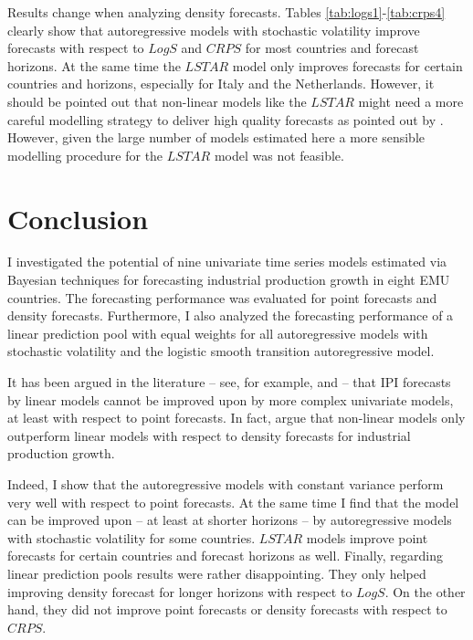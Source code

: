 \documentclass[12pt,letterpaper,fleqn]{article}           %
\begin{document}
Results change when analyzing density forecasts. Tables \ref{tab:logs1}-\ref{tab:crps4} clearly show that autoregressive models with stochastic volatility improve forecasts with respect to $LogS$ and $CRPS$ for most countries and forecast horizons. At the same time the $LSTAR$ model only improves forecasts for certain countries and horizons, especially for Italy and the Netherlands. However, it should be pointed out that non-linear models like the $LSTAR$ might need a more careful modelling strategy to deliver high quality forecasts as pointed out by \textcite{ter05}. However, given the large number of models estimated here a more sensible modelling procedure for the $LSTAR$ model was not feasible.


\section{Conclusion}
\label{sec:conclusion}

I investigated the potential of nine univariate time series models estimated via Bayesian techniques for forecasting industrial production growth in eight EMU countries. The forecasting performance was evaluated for point forecasts and density forecasts. Furthermore, I also analyzed the forecasting performance of a linear prediction pool with equal weights for all autoregressive models with stochastic volatility and the logistic smooth transition autoregressive model. 

It has been argued in the literature -- see, for example, \textcite{marc02} and \textcite{dijk03} -- that IPI forecasts by linear models cannot be improved upon by more complex univariate models, at least with respect to point forecasts. In fact, \textcite{dijk03} argue that non-linear models only outperform linear models with respect to density forecasts for industrial production growth.

Indeed, I show that the autoregressive models with constant variance perform very well with respect to point forecasts. At the same time I find that the model can be improved upon -- at least at shorter horizons -- by autoregressive models with stochastic volatility for some countries. $LSTAR$ models improve point forecasts for certain countries and forecast horizons as well. Finally, regarding linear prediction pools results were rather disappointing. They only helped improving density forecast for longer horizons with respect to $LogS$. On the other hand, they did not improve point forecasts or density forecasts with respect to $CRPS$.
\end{document}
